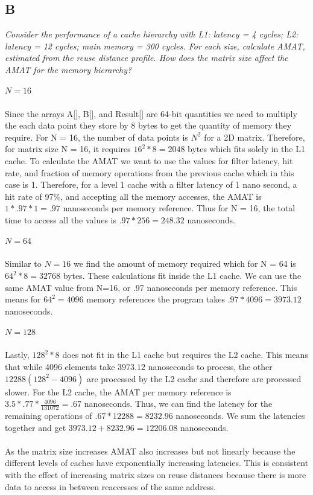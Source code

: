 \documentclass[10pt]{article}
\begin{document}
\subsection{B}
\textit{Consider the performance of a cache hierarchy with L1: latency = 4 cycles; L2: latency
= 12 cycles; main memory = 300 cycles. For each size, calculate AMAT, estimated
from the reuse distance profile. How does the matrix size affect the AMAT for the
memory hierarchy?}
\subparagraph{$N=16$} Since the arrays A[], B[], and Result[] are 64-bit quantities we need to multiply the each data point they store by 8 bytes to get the quantity 
of memory they require. For N = 16, the number of data points is $N^2$ for a 2D matrix. Therefore, for matrix size N = 16, it requires $16^2 * 8 = 2048$ bytes which fits solely in the L1 cache. 
To calculate the AMAT we want to use the values for filter latency, hit rate, and fraction of memory operations from the previous cache which in this case is 1. Therefore, for a level 1 cache with 
a filter latency of 1 nano second, a hit rate of 97\%, and accepting all the memory accesses, the AMAT is $1 * .97 * 1 = .97$ nanoseconds per memory reference. Thus for N = 16, the total time 
to access all the values is $.97 * 256 = 248.32$ nanoseconds. 
\subparagraph{$N=64$} Similar to $N=16$ we find the amount of memory required which for N = 64 is $64^2 * 8 = 32768$ bytes. These calculations fit inside the L1 cache. We can use the same AMAT value from N=16, 
or .97 nanoseconds per memory reference. This means for $64^2 = 4096$ memory references the program takes $.97 * 4096 = 3973.12$ nanoseconds.
\subparagraph{$N=128$} Lastly, $128^2 * 8$ does not fit in the L1 cache but requires the L2 cache. This means that while 4096 elements take $3973.12$ nanoseconds to process, the other $12288 (128^2 - 4096)$ 
are processed by the L2 cache and therefore are processed slower. For the L2 cache, the AMAT per memory reference is $3.5 * .77 * \frac{4096}{131072} = .67$ nanoseconds. Thus, we can find the latency for 
the remaining operations of $.67 * 12288 = 8232.96$ nanoseconds. We sum the latencies together and get $3973.12 + 8232.96 = 12206.08$ nanoseconds. 

\paragraph{} As the matrix size increases AMAT also increases but not linearly because the different levels of caches have exponentially increasing latencies. This is consistent with the effect of increasing matrix sizes on
reuse distances because there is more data to access in between reaccesses of the same address. 
\end{document}
